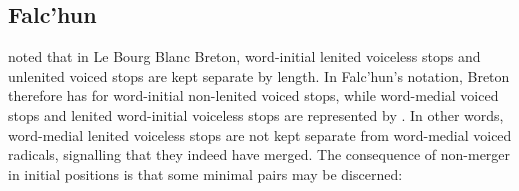 \subsection{Falc'hun}
\textcite[63]{falchun_systeme_1951} noted that in Le Bourg Blanc Breton, word-initial lenited voiceless stops and unlenited voiced stops are kept separate by length.
In Falc'hun's notation, Breton therefore has  for word-initial non-lenited voiced stops, while word-medial voiced stops and lenited word-initial voiceless stops are represented by . In other words, word-medial lenited voiceless stops are not kept separate from word-medial voiced radicals, signalling that they indeed have merged. The consequence of non-merger in initial positions is that some minimal pairs may be discerned:

